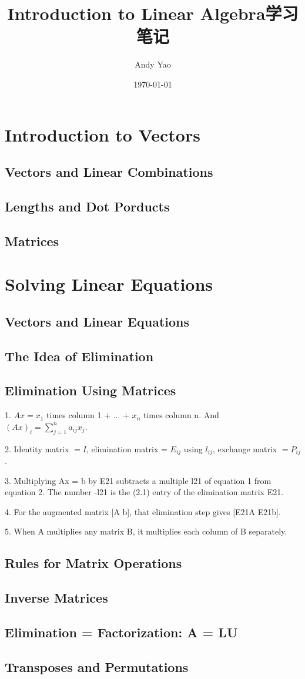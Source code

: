 \documentclass[UTF8]{ctexart}
\title{Introduction to Linear Algebra学习笔记}
\author{Andy Yao}
\date{\today}
\begin{document}
\maketitle

\section{Introduction to Vectors}
  \subsection{Vectors and Linear Combinations}
  \subsection{Lengths and Dot Porducts}
  \subsection{Matrices}

\section{Solving Linear Equations}
  \subsection{Vectors and Linear Equations}
  \subsection{The Idea of Elimination}
  \subsection{Elimination Using Matrices}
1. $Ax = x_{1}$ times column 1 + ... + $x_{n}$ times column n. And $(Ax)_{i} = \sum_{j=1}^n a_{ij}x_{j}$.

2. Identity matrix $= I$, elimination matrix = $E_{ij}$ using $l_{ij}$, exchange matrix $= P_{ij}$.

3. Multiplying Ax = b by E21 subtracts a multiple l21 of equation 1 from equation 2. The number -l21 is the (2.1) entry
of the elimination matrix E21.

4. For the augmented matrix [A b], that elimination step gives [E21A E21b].

5. When A multiplies any matrix B, it multiplies each column of B separately.

  \subsection{Rules for Matrix Operations}
  \subsection{Inverse Matrices}
  \subsection{Elimination = Factorization: A = LU}
  \subsection{Transposes and Permutations}
\end{document}
